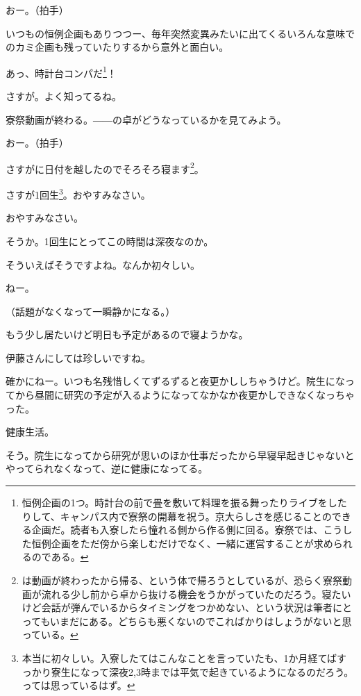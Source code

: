 \begin{multicols}{2}
おー。（拍手）

いつもの恒例企画もありつつー、毎年突然変異みたいに出てくるいろんな意味でのカミ企画も残っていたりするから意外と面白い。

あっ、時計台コンパだ\footnote{恒例企画の1つ。時計台の前で畳を敷いて料理を振る舞ったりライブをしたりして、キャンパス内で寮祭の開幕を祝う。京大らしさを感じることのできる企画だ。読者も入寮したら憧れる側から作る側に回る。寮祭では、こうした恒例企画をただ傍から楽しむだけでなく、一緒に運営することが求められるのである。}！

さすが。よく知ってるね。

寮祭動画が終わる。――の卓がどうなっているかを見てみよう。

おー。（拍手）

さすがに日付を越したのでそろそろ寝ます\footnote{は動画が終わったから帰る、という体で帰ろうとしているが、恐らく寮祭動画が流れる少し前から卓から抜ける機会をうかがっていたのだろう。寝たいけど会話が弾んでいるからタイミングをつかめない、という状況は筆者にとってもいまだにある。どちらも悪くないのでこればかりはしょうがないと思っている。}。

さすが1回生\footnote{本当に初々しい。入寮したてはこんなことを言っていたも、1か月経てばすっかり寮生になって深夜2,3時までは平気で起きているようになるのだろう。っては思っているはず。}。おやすみなさい。

おやすみなさい。

そうか。1回生にとってこの時間は深夜なのか。

そういえばそうですよね。なんか初々しい。

ねー。

（話題がなくなって一瞬静かになる。）

もう少し居たいけど明日も予定があるので寝ようかな。

伊藤さんにしては珍しいですね。

確かにねー。いつも名残惜しくてずるずると夜更かししちゃうけど。院生になってから昼間に研究の予定が入るようになってなかなか夜更かしできなくなっちゃった。

健康生活。

そう。院生になってから研究が思いのほか仕事だったから早寝早起きじゃないとやってられなくなって、逆に健康になってる。


\end{multicols}
